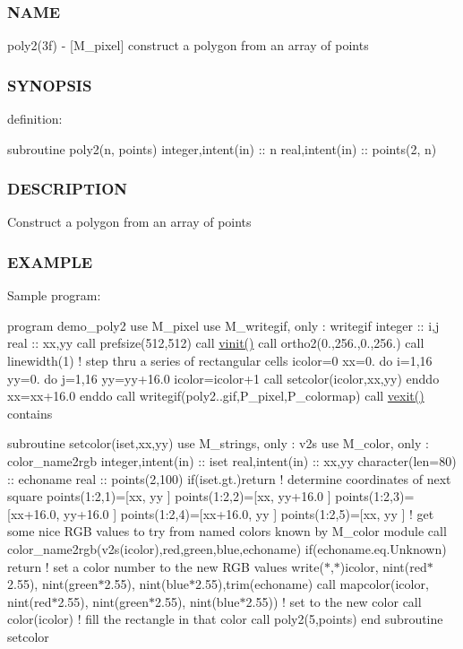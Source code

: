 \subsubsection*{N\+A\+ME}

poly2(3f) -\/ \mbox{[}M\+\_\+pixel\mbox{]} construct a polygon from an array of points 

\subsubsection*{S\+Y\+N\+O\+P\+S\+IS}

definition\+:

subroutine poly2(n, points) integer,intent(in) \+:\+: n real,intent(in) \+:\+: points(2, n)

\subsubsection*{D\+E\+S\+C\+R\+I\+P\+T\+I\+ON}

Construct a polygon from an array of points \subsubsection*{E\+X\+A\+M\+P\+LE}

Sample program\+:

program demo\+\_\+poly2 use M\+\_\+pixel use M\+\_\+writegif, only \+: writegif integer \+:\+: i,j real \+:\+: xx,yy call prefsize(512,512) call \hyperlink{namespacem__pixel_ac03ca8f23fdadb60599b6ea4dc87a6d9}{vinit()} call ortho2(0.,256.,0.,256.) call linewidth(1) ! step thru a series of rectangular cells icolor=0 xx=0. do i=1,16 yy=0. do j=1,16 yy=yy+16.0 icolor=icolor+1 call setcolor(icolor,xx,yy) enddo xx=xx+16.0 enddo call writegif(\textquotesingle{}poly2..\+gif\textquotesingle{},P\+\_\+pixel,P\+\_\+colormap) call \hyperlink{namespacem__pixel_a19ad6b65752322b0029a62cc0ebec3e8}{vexit()} contains

subroutine setcolor(iset,xx,yy) use M\+\_\+strings, only \+: v2s use M\+\_\+color, only \+: color\+\_\+name2rgb integer,intent(in) \+:\+: iset real,intent(in) \+:\+: xx,yy character(len=80) \+:\+: echoname real \+:\+: points(2,100) if(iset.\+gt.)return ! determine coordinates of next square points(1\+:2,1)=\mbox{[}xx, yy \mbox{]} points(1\+:2,2)=\mbox{[}xx, yy+16.0 \mbox{]} points(1\+:2,3)=\mbox{[}xx+16.0, yy+16.0 \mbox{]} points(1\+:2,4)=\mbox{[}xx+16.0, yy \mbox{]} points(1\+:2,5)=\mbox{[}xx, yy \mbox{]} ! get some nice R\+GB values to try from named colors known by M\+\_\+color module call color\+\_\+name2rgb(v2s(icolor),red,green,blue,echoname) if(echoname.\+eq.\textquotesingle{}Unknown\textquotesingle{}) return ! set a color number to the new R\+GB values write($\ast$,$\ast$)icolor, nint(red$\ast$2.55), nint(green$\ast$2.55), nint(blue$\ast$2.55),trim(echoname) call mapcolor(icolor, nint(red$\ast$2.55), nint(green$\ast$2.55), nint(blue$\ast$2.55)) ! set to the new color call color(icolor) ! fill the rectangle in that color call poly2(5,points) end subroutine setcolor

